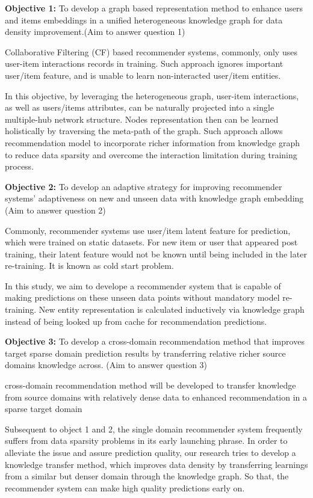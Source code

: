\bigskip
\textbf{Objective 1:} To develop a graph based representation method to enhance users and items embeddings in a unified heterogeneous knowledge graph for data density improvement.(Aim to answer question 1)

Collaborative Filtering (CF) based recommender systems, commonly, only uses user-item interactions records in training. Such approach ignores important user/item feature, and is unable to learn non-interacted user/item entities. 

In this objective, by leveraging the heterogeneous graph, user-item interactions, as well as users/items attributes, can be naturally projected into a single multiple-hub network \citep{Shi2017} structure. Nodes representation then can be learned holistically by traversing the meta-path of the graph. Such approach allows recommendation model to incorporate richer information from knowledge graph to reduce data sparsity and overcome the interaction limitation during training process.


\bigskip
\textbf{Objective 2:} To develop an adaptive strategy for improving recommender systems’ adaptiveness on new and unseen data with knowledge graph embedding (Aim to answer question 2)

Commonly, recommender systems use user/item latent feature for prediction, which were trained on static datasets. For new item or user that appeared post training, their latent feature would not be known until being included in the later re-training. It is known as cold start problem.

In this study, we aim to develope a recommender system that is capable of making predictions on these unseen data points without mandatory model re-training. New entity representation is calculated inductively via knowledge graph instead of being looked up from cache for recommendation predictions.


\bigskip
\textbf{Objective 3:} To develop a cross-domain recommendation method that improves target sparse domain prediction results by transferring relative richer source domains knowledge across. (Aim to answer question 3)

cross-domain recommendation method will be developed to transfer knowledge from source domains with relatively dense data to  enhanced recommendation in a sparse target domain

Subsequent to object 1 and 2, the single domain recommender system frequently suffers from data sparsity problems in its early launching phrase. In order to alleviate the issue and assure prediction quality, our research tries to develop a knowledge transfer method, which improves data density by transferring learnings from a similar but denser domain through the knowledge graph. So that, the recommender system can make high quality predictions early on.

